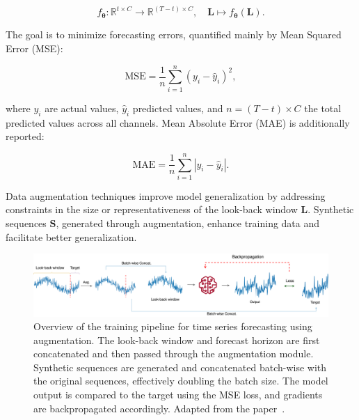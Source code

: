 \begin{equation}
f_{\boldsymbol{\theta}}: \mathbb{R}^{t \times C} \rightarrow \mathbb{R}^{(T - t) \times C}, \quad \mathbf{L} \mapsto f_{\boldsymbol{\theta}}(\mathbf{L}).
\end{equation}

The goal is to minimize forecasting errors, quantified mainly by Mean Squared Error (MSE):

\begin{equation}
\label{eq: mse}
\text{MSE} = \frac{1}{n}\sum_{i=1}^{n}(y_i - \hat{y}_i)^2,
\end{equation}

where $y_i$ are actual values, $\hat{y}_i$ predicted values, and $n = (T - t) \times C$ the total predicted values across all channels. Mean Absolute Error (MAE) is additionally reported:

\begin{equation}
\text{MAE} = \frac{1}{n}\sum_{i=1}^{n}|y_i - \hat{y}_i|.
\end{equation}



Data augmentation techniques improve model generalization by addressing constraints in the size or representativeness of the look-back window $\mathbf{L}$. Synthetic sequences $\mathbf{S}$, generated through augmentation, enhance training data and facilitate better generalization.



\begin{figure}[h!]
    \centering
\includegraphics[width=1.0\textwidth, height=1.0\textheight, keepaspectratio]{./images/framework_train2.drawio.png}
\caption{Overview of the training pipeline for time series forecasting using augmentation. The look-back window and forecast horizon are first concatenated and then passed through the augmentation module. Synthetic sequences are generated and concatenated batch-wise with the original sequences, effectively doubling the batch size. The model output is compared to the target using the MSE loss, and gradients are backpropagated accordingly. Adapted from the paper~\cite{chen2023fraugfrequencydomainaugmentation}.}

    \label{fig:train_fw}
\end{figure}

